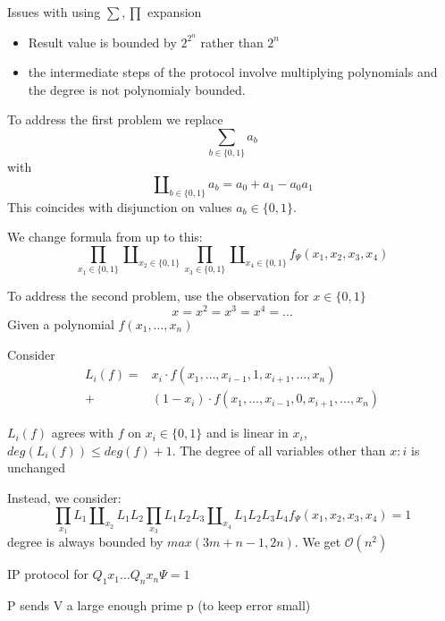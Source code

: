 \documentclass[a4paper,12pt]{article}
\theoremstyle{definition}
\theoremstyle{remark}
\begin{document}
Issues with using $\sum, \prod$ expansion
\begin{itemize}
    \item Result value is bounded by $2^{2^n}$ rather than $2^n$
    \item the intermediate steps of the protocol involve multiplying polynomials and the degree is not polynomialy bounded.
\end{itemize}

To address the first problem we replace 
\begin{equation*}
    \sum_{b \in \{0, 1\}} a_b
\end{equation*}
with
\begin{equation*}
   \amalg_{b \in \{0, 1\}} a_b = a_0 + a_1 - a_0 a_1 %
\end{equation*}
This coincides with disjunction on values $a_b \in \{0, 1\}$.

We change formula from up to this:
\begin{equation*}
    \prod_{x_1 \in \{0, 1\}} \amalg_{x_2 \in \{0, 1\}} \prod_{x_3 \in \{0, 1\}} \amalg_{x_4 \in \{0, 1\}} f_\Psi (x_1, x_2, x_3, x_4)
\end{equation*}

To address the second problem, use the observation for $x \in \{0, 1\}$
\begin{equation*}
    x = x^2 = x^3 = x^4 = \dots
\end{equation*}
Given a polynomial $f(x_1, \dots, x_n)$

Consider
\begin{align*}
    L_i(f) =& x_i \cdot f(x_1, \dots, x_{i-1}, 1, x_{i+1}, \dots, x_n) \\
           +& (1 - x_i) \cdot f(x_1, \dots, x_{i-1}, 0, x_{i+1}, \dots, x_n)
\end{align*}

$L_i(f)$ agrees with $f$ on $x_i \in \{0, 1\}$ and is linear in $x_i$, $deg(L_i(f)) \leq deg(f) + 1$.
The degree of all variables other than $x:i$ is unchanged

Instead, we consider:
\begin{equation*}
    \prod_{x_1} L_1 \amalg_{x_2} L_1 L_2 \prod_{x_3} L_1 L_2 L_3 \amalg_{x_4} L_1 L_2 L_3 L_4 f_\Psi(x_1, x_2, x_3, x_4) = 1
\end{equation*}
degree is always bounded by $max(3m + n - 1, 2n)$. We get $\mathscr{O}(n^2)$

IP protocol for $Q_1 x_1 \dots Q_n x_n \Psi = 1$

P sends V a large enough prime p (to keep error small)
\end{document}
